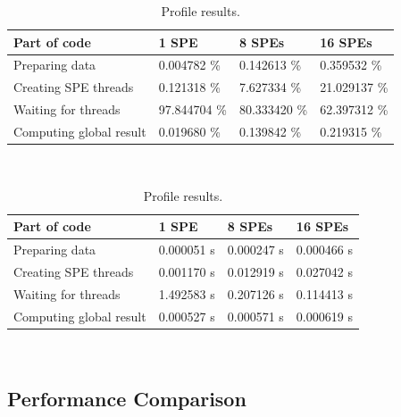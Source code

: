 \begin{table}[htb]
\begin{footnotesize}
\caption{Profile results.}
\label{tab:t3}
\newcommand{\m}{\hphantom{$-$}}
\newcommand{\cc}[1]{\multicolumn{1}{c}{#1}}
\renewcommand{\tabcolsep}{0.5pc} %
\renewcommand{\arraystretch}{1.2} %
\begin{tabular}{@{}llll}
\hline
\textbf{Part of code} & \textbf{1 SPE} & \textbf{8 SPEs} & \textbf{16 SPEs} \\
\hline
Preparing data & 0.004782 \% & 0.142613 \% & 0.359532 \% \\
Creating  SPE threads & 0.121318 \% & 7.627334 \% & 21.029137 \% \\
Waiting for threads & 97.844704 \% & 80.333420 \% & 62.397312 \% \\
Computing global result & 0.019680 \% & 0.139842 \% & 0.219315 \% \\
\hline
\end{tabular}\\[2pt]

\bigskip

\begin{tabular}{@{}llll}
\hline
\textbf{Part of code} & \textbf{1 SPE} & \textbf{8 SPEs} & \textbf{16 SPEs} \\
\hline
Preparing data & 0.000051 s & 0.000247 s & 0.000466 s \\
Creating  SPE threads & 0.001170 s & 0.012919 s & 0.027042 s \\
Waiting for threads & 1.492583 s & 0.207126 s & 0.114413 s \\
Computing global result & 0.000527 s & 0.000571 s & 0.000619 s \\
\hline
\end{tabular}\\[2pt]
\end{footnotesize}
\end{table}

\subsection{Performance Comparison}

